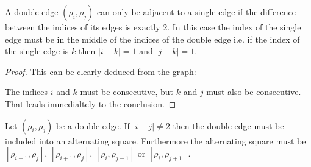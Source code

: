 \begin{proposition}
  \label{adjacent-double}
  A double edge $(\rho_i, \rho_j)$ can only be adjacent to a single edge if the difference between the indices of its edges is exactly 2. In this case the index of the single edge must be in the middle of the indices of the double edge i.e. if the index of the single edge is $k$ then $|i-k| = 1$ and $|j-k| = 1$.
\end{proposition}

\begin{proof}
  This can be clearly deduced from the graph:

  \begin{figure}[H]
    \begin{center}
      \caption{}
    \end{center}
  \end{figure}

  The indices $i$ and $k$ must be consecutive, but $k$ and $j$ must also be consecutive. That leads immedialtely to the conclusion.

\end{proof}

\begin{corollary}
  \label{continue-double-edge}
  Let $(\rho_i, \rho_j)$ be a double edge. If $|i - j| \neq 2$ then the double edge must be included into an alternating square. Furthermore the alternating square must be  $[\rho_{i-1}, \rho_j]$, $[\rho_{i+1}, \rho_j]$, $[\rho_i, \rho_{j-1}]$ or $[\rho_i, \rho_{j+1}]$.
\end{corollary}


